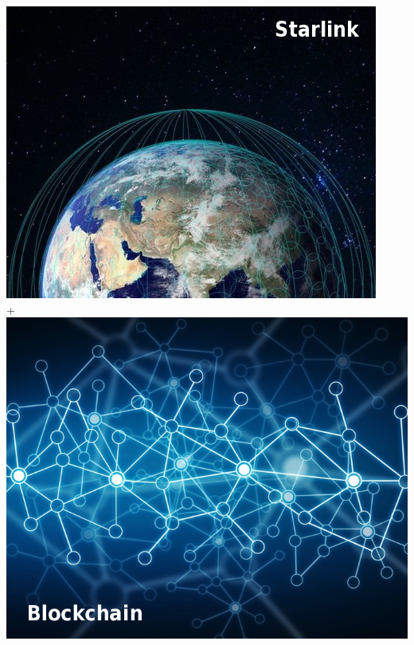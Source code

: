 \documentclass[notitlepage, usenames,dvipsnames]{beamer}
\begin{document}
\begin{frame}
\begin{columns}
            \centering
            \includegraphics[scale=0.247]{../img/starlink.jpg} \\[1ex]
            {\Large +} \\[1ex]
            \includegraphics[scale=0.17]{../img/blockchain-fancy.jpg}

        \end{columns}


    \end{frame}
\end{document}
